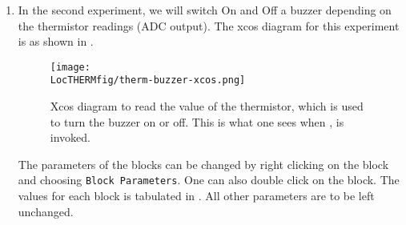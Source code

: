 \begin{enumerate}
\item In the second experiment, we will switch On and Off a buzzer
  depending on the thermistor readings (ADC output). The xcos diagram
  for this experiment is as shown in .
  \begin{figure}
    \centering
    \texttt{[image: \\LocTHERMfig/therm-buzzer-xcos.png]}
    \caption[Xcos diagram to read the value of thermistor, which is
    used to turn the buzzer on or off] {Xcos diagram to read the value
      of the thermistor, which is used to turn the buzzer on or off.
      This is what one sees when
      , is invoked.}
    \label{fig:therm-buzzer}
  \end{figure}
  The parameters of the blocks can be changed by right clicking on the
  block and choosing {\tt Block Parameters}. One can also double click
  on the block. The values for each block is tabulated in
  .  All other parameters are to be left
  unchanged.


\end{enumerate}
